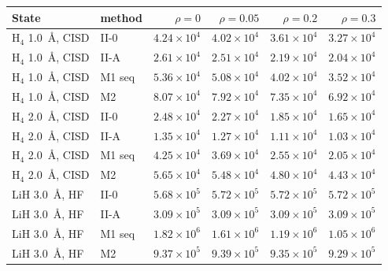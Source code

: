 \begin{tabular}{@{}llrrrr@{}}
\toprule
State & method & $\rho=0$ & $\rho=0.05$ & $\rho=0.2$ & $\rho=0.3$ \\
\midrule
H$_4$ 1.0~\AA, CISD & II-0 & $4.24\times10^{4}$ & $4.02\times10^{4}$ & $3.61\times10^{4}$ & $3.27\times10^{4}$ \\
H$_4$ 1.0~\AA, CISD & II-A & $2.61\times10^{4}$ & $2.51\times10^{4}$ & $2.19\times10^{4}$ & $2.04\times10^{4}$ \\
H$_4$ 1.0~\AA, CISD & M1 seq & $5.36\times10^{4}$ & $5.08\times10^{4}$ & $4.02\times10^{4}$ & $3.52\times10^{4}$ \\
H$_4$ 1.0~\AA, CISD & M2 & $8.07\times10^{4}$ & $7.92\times10^{4}$ & $7.35\times10^{4}$ & $6.92\times10^{4}$ \\
H$_4$ 2.0~\AA, CISD & II-0 & $2.48\times10^{4}$ & $2.27\times10^{4}$ & $1.85\times10^{4}$ & $1.65\times10^{4}$ \\
H$_4$ 2.0~\AA, CISD & II-A & $1.35\times10^{4}$ & $1.27\times10^{4}$ & $1.11\times10^{4}$ & $1.03\times10^{4}$ \\
H$_4$ 2.0~\AA, CISD & M1 seq & $4.25\times10^{4}$ & $3.69\times10^{4}$ & $2.55\times10^{4}$ & $2.05\times10^{4}$ \\
H$_4$ 2.0~\AA, CISD & M2 & $5.65\times10^{4}$ & $5.48\times10^{4}$ & $4.80\times10^{4}$ & $4.43\times10^{4}$ \\
LiH 3.0~\AA, HF & II-0 & $5.68\times10^{5}$ & $5.72\times10^{5}$ & $5.72\times10^{5}$ & $5.72\times10^{5}$ \\
LiH 3.0~\AA, HF & II-A & $3.09\times10^{5}$ & $3.09\times10^{5}$ & $3.09\times10^{5}$ & $3.09\times10^{5}$ \\
LiH 3.0~\AA, HF & M1 seq & $1.82\times10^{6}$ & $1.61\times10^{6}$ & $1.19\times10^{6}$ & $1.05\times10^{6}$ \\
LiH 3.0~\AA, HF & M2 & $9.37\times10^{5}$ & $9.39\times10^{5}$ & $9.35\times10^{5}$ & $9.29\times10^{5}$ \\
\bottomrule
\end{tabular}
